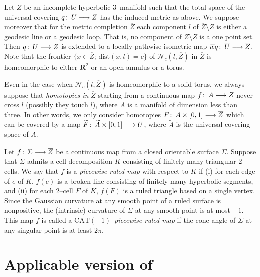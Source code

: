 \documentclass{gtart_a}
\theoremstyle{definition}
\numberwithin{equation}{section}
\begin{document}
Let $Z$ be an incomplete hyperbolic $3$--manifold such that the total space of the universal covering 
$q\mskip0.5mu\colon\thinspace U\longrightarrow Z$ has the induced metric as above.
We suppose moreover that for the metric completion $\overline Z$ each component $l$ of $\overline Z\setminus Z$ 
is either a geodesic line or a geodesic loop.
That is, no component of $\overline Z\setminus Z$ is a one point set.
Then $q\mskip0.5mu\colon\thinspace U\longrightarrow Z$ is extended to a locally pathwise isometric map $\bar q\co \overline U\longrightarrow 
\overline Z$.
Note that the frontier $\{x\in \overline Z;\, \mathrm{dist}(x,l)=c\}$ of $\mathcal{N}_c(l,\overline Z)$ in 
$\overline Z$ is homeomorphic to either $\mathbf{R}^2$ or an open annulus or a torus.


\begin{remark}\label{r_1}
Even in the case when $\mathcal{N}_c(l,\overline Z)$ is homeomorphic to a solid torus, we always suppose that 
\emph{homotopies in\/} $\overline Z$ starting from a continuous map $f\mskip0.5mu\colon\thinspace A\longrightarrow Z$ never cross $l$ (possibly 
they touch $l$), where $A$ is a manifold of dimension less than three.
In other words, we only consider homotopies $F\mskip0.5mu\colon\thinspace A\times [0,1]\longrightarrow \overline Z$ which can be covered by a 
map $\tilde F\co \tilde A\times [0,1]\longrightarrow \overline U$, where $\tilde A$ is the universal covering space 
of $A$.
\end{remark}

\begin{definition}\label{d_1}
Let $f\mskip0.5mu\colon\thinspace \Sigma\longrightarrow \overline Z$ be a continuous map from a closed orientable surface $\Sigma$.
Suppose that $\Sigma$ admits a cell decomposition $K$ consisting of finitely many triangular $2$--cells.
We say that $f$ is a \emph{piecewise ruled map\/} with respect to $K$ if (i) for each edge of $e$ of $K$, $f(e)$ 
is a broken line consisting of finitely many hyperbolic segments, and (ii) for each $2$--cell $F$ of $K$, $f(F)$ is 
a ruled triangle based on a single vertex.
Since the Gaussian curvature at any smooth point of a ruled surface is nonpositive, the (intrinsic) curvature of 
$\Sigma$ at any smooth point is at most $-1$. 
This map $f$ is called a $\mathrm{CAT}(-1)$--\emph{piecewise ruled map\/} if the cone-angle of $\Sigma$ at any 
singular point is at least $2\pi$.
\end{definition}


\section[Applicable version of Theorem 0.1]{Applicable version of }\label{S2}
\end{document}
